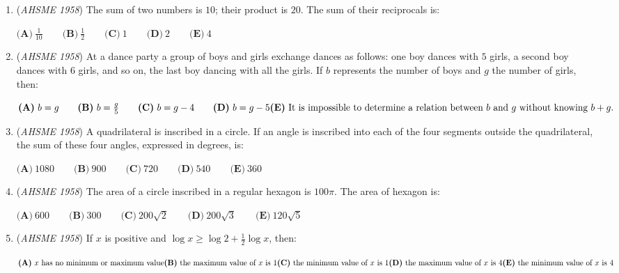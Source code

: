 \begin{enumerate}
	\item (\textit{AHSME 1958}) The sum of two numbers is $10$; their product is $20$. The sum of their reciprocals is:


 $\textbf{(A)}\ \frac{1}{10}\qquad  \textbf{(B)}\ \frac{1}{2}\qquad  \textbf{(C)}\ 1\qquad  \textbf{(D)}\ 2\qquad  \textbf{(E)}\ 4$


	\item (\textit{AHSME 1958}) At a dance party a group of boys and girls exchange dances as follows: one boy dances with $5$ girls, a second boy dances with $6$ girls, and so on, the last boy dancing with all the girls. If $b$ represents the number of boys and $g$ the number of girls, then:


 $\textbf{(A)}\ b = g\qquad  \textbf{(B)}\ b = \frac{g}{5}\qquad  \textbf{(C)}\ b = g - 4\qquad  \textbf{(D)}\ b = g - 5\qquad \\ \textbf{(E)}\ \text{It is impossible to determine a relation between }{b}\text{ and }{g}\text{ without knowing }{b + g.}$


	\item (\textit{AHSME 1958}) A quadrilateral is inscribed in a circle. If an angle is inscribed into each of the four segments outside the quadrilateral, the sum of these four angles, expressed in degrees, is:


 $\textbf{(A)}\ 1080\qquad  \textbf{(B)}\ 900\qquad  \textbf{(C)}\ 720\qquad  \textbf{(D)}\ 540\qquad  \textbf{(E)}\ 360$


	\item (\textit{AHSME 1958}) The area of a circle inscribed in a regular hexagon is $100\pi$. The area of hexagon is:


 $\textbf{(A)}\ 600\qquad  \textbf{(B)}\ 300\qquad  \textbf{(C)}\ 200\sqrt{2}\qquad  \textbf{(D)}\ 200\sqrt{3}\qquad  \textbf{(E)}\ 120\sqrt{5}$


	\item (\textit{AHSME 1958}) If $x$ is positive and $\log{x} \ge \log{2} + \frac{1}{2}\log{x}$, then:


 $\textbf{(A)}\ {x}\text{ has no minimum or maximum value}\qquad \\ \textbf{(B)}\ \text{the maximum value of }{x}\text{ is }{1}\qquad \\ \textbf{(C)}\ \text{the minimum value of }{x}\text{ is }{1}\qquad \\ \textbf{(D)}\ \text{the maximum value of }{x}\text{ is }{4}\qquad \\ \textbf{(E)}\ \text{the minimum value of }{x}\text{ is }{4}$



\end{enumerate}
